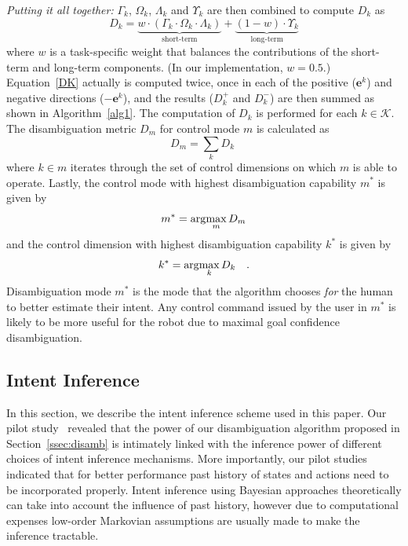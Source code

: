\textit{Putting it all together:}
$\Gamma_k$, $\Omega_k$, $\Lambda_k$ and $\Upsilon_k$ are then combined to compute $D_{k}$ as 
\begin{equation}\label{DK}
D_{k} = \underbrace{w\cdot(\Gamma_k\cdot \Omega_k\cdot\Lambda_k)}_{\text{short-term}} + \underbrace{(1 - w)\cdot \Upsilon_k}_{\text{long-term}}
\end{equation}
where $w$ is a task-specific weight that balances the contributions of the short-term and long-term components. (In our implementation, $w=0.5$.) Equation~\ref{DK} actually is computed twice, once in each of the positive ($\boldsymbol{e}^k$) and negative directions ($-\boldsymbol{e}^k$), and the results ($D_k^+$ and $D_k^-$) are then summed as shown in Algorithm~\ref{alg1}. The computation of $D_k$ is performed for each $k \in \mathcal{K}$. The disambiguation metric $D_m$ for control mode $m$ is calculated as 
\begin{equation}\label{EQ2}
D_m = \sum_{k} D_{k} \;
\end{equation}
where $k \in m$ iterates through the set of control dimensions on which $m$ is able to operate.
Lastly, the control mode with highest disambiguation capability $m^*$ is given by
\begin{equation*}
m^* = \arg\!\max_m  D_{m}
\end{equation*}
and the control dimension with highest disambiguation capability $k^{*}$ is given by
\begin{equation*}
k^* = \arg\!\max_k D_k~~~.
\end{equation*}
Disambiguation mode $m^{*}$ is the mode that the algorithm chooses \textit{for} the human to better estimate their intent. Any control command issued by the user in $m^*$ is likely to be more useful for the robot due to maximal goal confidence disambiguation.
\subsection{Intent Inference}\label{ssec:inference}
In this section,  we describe the intent inference scheme used in this paper. Our pilot study~\cite{gopinath2017mode} revealed that the power of our disambiguation algorithm proposed in Section~\ref{ssec:disamb} is intimately linked with the inference power of different choices of intent inference mechanisms. More importantly, our pilot studies indicated that for better performance past history of states and actions need to be incorporated properly. Intent inference using Bayesian approaches theoretically can take into account the influence of past history, however due to computational expenses low-order Markovian assumptions are usually made to make the inference tractable. 

